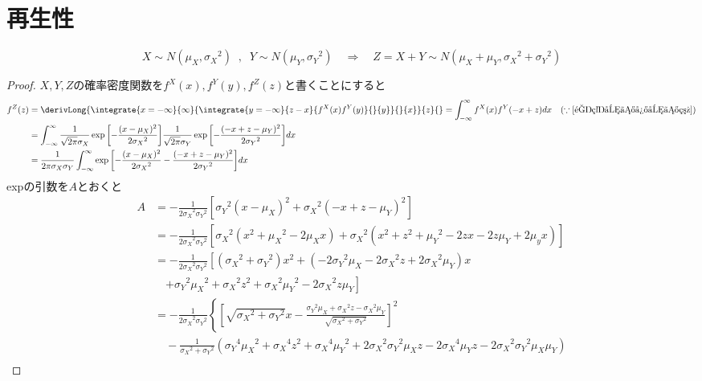     \section{再生性}
        \begin{shadebox}
            \[X \sim N(\mu_X,{\sigma_X}^2)\;\;,\;\;Y \sim N(\mu_Y,{\sigma_Y}^2) \quad \Rightarrow \quad Z=X+Y \sim N(\mu_X+\mu_Y,{\sigma_X}^2+{\sigma_Y}^2)\]
        \end{shadebox}
        \begin{proof}
            \quad\par
            $X,Y,Z$の確率密度関数を$f^X(x),f^Y(y),f^Z(z)$と書くことにすると
            \begin{align*}
                f^Z(z) &= \derivLong{\integrate{x=-\infty}{\infty}{\integrate{y=-\infty}{z-x}{f^X(x)f^Y(y)}{}{y}}{}{x}}{z}{} = \int_{-\infty}^{\infty}{f^X(x)f^Y(-x+z) dx} \quad(\because\ref{重積分の微分の系}) \\
                &= \int_{-\infty}^{\infty}{\frac{1}{\sqrt{2\pi}\sigma_X}\exp{\left[-\frac{(x-\mu_X)^2}{2{\sigma_X}^2}\right]}\frac{1}{\sqrt{2\pi}\sigma_Y}\exp{\left[-\frac{(-x+z-\mu_Y)^2}{2{\sigma_Y}^2}\right]} dx}\\
                &= \frac{1}{2\pi\sigma_X\sigma_Y}\int_{-\infty}^{\infty}{\exp{\left[-\frac{(x-\mu_X)^2}{2{\sigma_X}^2} - \frac{(-x+z-\mu_Y)^2}{2{\sigma_Y}^2}\right]} dx}
            \end{align*}
            expの引数を$A$とおくと
            \begin{align*}
                A &= -\frac{1}{{2\sigma_X}^2{\sigma_Y}^2}\left[{\sigma_Y}^2(x-\mu_X)^2 + {\sigma_X}^2(-x+z-\mu_Y)^2\right]\\
                &= -\frac{1}{{2\sigma_X}^2{\sigma_Y}^2}\left[{\sigma_X}^2(x^2+{\mu_X}^2-2\mu_Xx)+{\sigma_X}^2(x^2+z^2+{\mu_Y}^2-2zx-2z\mu_Y+2\mu_yx)\right]\\
                &= -\frac{1}{{2\sigma_X}^2{\sigma_Y}^2}\left[({\sigma_X}^2+{\sigma_Y}^2)x^2 + (-2{\sigma_Y}^2\mu_X - 2{\sigma_X}^2z + 2{\sigma_X}^2\mu_Y)x \right.\\
                &\quad \left. + {\sigma_Y}^2{\mu_X}^2 + {\sigma_X}^2z^2 + {\sigma_X}^2{\mu_Y}^2 - 2{\sigma_X}^2z\mu_Y\right]\\
                &= -\frac{1}{{2\sigma_X}^2{\sigma_Y}^2}\left\{{\left[\sqrt{{\sigma_X}^2+{\sigma_Y}^2}x - \frac{{\sigma_Y}^2\mu_X + {\sigma_X}^2z - {\sigma_X}^2\mu_Y}{\sqrt{{\sigma_X}^2+{\sigma_Y}^2}}\right]}^2\right.\\
                &\quad -\frac{1}{{\sigma_X}^2+{\sigma_Y}^2}\left({\sigma_Y}^4{\mu_X}^2 + {\sigma_X}^4z^2 + {\sigma_X}^4{\mu_Y}^2 + 2{\sigma_X}^2{\sigma_Y}^2\mu_X z - 2{\sigma_X}^4\mu_Y z - 2{\sigma_X}^2{\sigma_Y}^2\mu_X\mu_Y\right)\\

\end{align*}
\end{proof}
